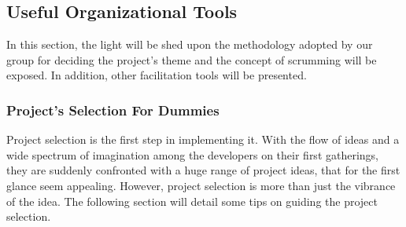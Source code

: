 \subsection{Useful Organizational Tools}
In this section, the light will be shed upon the methodology adopted by our group for deciding the project's theme and the concept of scrumming will be exposed. In addition, other facilitation tools will be presented.

\subsubsection{Project's Selection For Dummies}
Project selection is the first step in implementing it. With the flow of ideas and a wide spectrum of imagination among the developers on their first gatherings, they are suddenly confronted with a huge range of project ideas, that for the first glance seem appealing. However, project selection is more than just the vibrance of the idea. The following section will detail some tips on guiding the project selection.

